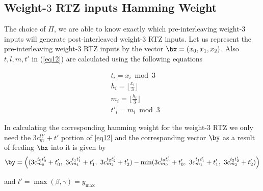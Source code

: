 \subsection{Weight-$3$ RTZ inputs Hamming Weight}
 The choice of $\Pi$, we are able to know exactly which pre-interleaving weight-$3$ inputs will generate post-interleaved weight-$3$ RTZ inputs. 
 Let us represent the pre-interleaving  weight-$3$ RTZ inputs by the vector $\bx=(x_0,x_1,x_2)$. Also $t,l,m,t'$ in (\ref{eq12}) are calculated using the following equations
 
 \begin{equation}
 \begin{split}
 &t_i=x_i \bmod 3\\
 &h_i=\Big\lfloor \frac{x_i}{3} \Big\rfloor\\
 &m_i=\Big\lfloor \frac{h_i}{3} \Big\rfloor\\
 &t'_i =m_i \bmod 3
 \end{split}
 \end{equation}

In calculating the corresponding hamming weight for the weight-$3$ RTZ we only need the $3c^{tt'}_{m}+t'$ portion of \ref{eq12} and the corresponding vector $\by$ as a result of feeding $\bx$ into it is given by
 $$\by=\Big((3c^{t_{0}t'_{0}}_{m_{0}}+t'_0,~3c^{t_{1}t'_{1}}_{m_{1}}+t'_1,~3c^{t_{2}t'_{2}}_{m_{2}}+t'_{2}) -\min(3c^{t_{0}t'_{0}}_{m_{0}}+t'_0,~3c^{t_{1}t'_{1}}_{m_{1}}+t'_1,~3c^{t_{2}t'_{2}}_{m_{2}}+t'_{2})\Big)$$
 
 and $l'=\max(\beta,\gamma)= y_{\max}$